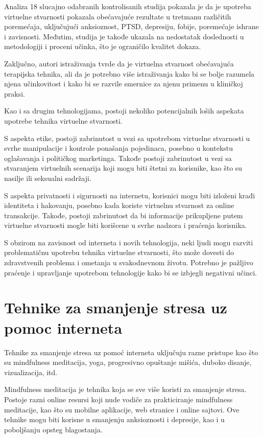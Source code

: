 \documentclass[a4paper]{article}
\begin{document}
Analiza 18 slucajno odabranih kontrolisanih studija pokazala je da je upotreba virtuelne stvarnosti pokazala obećavajuće rezultate u tretmanu različitih poremećaja, uključujući anksioznost, PTSD, depresiju, fobije, poremećaje ishrane i zavisnosti. Međutim, studija je takođe ukazala na nedostatak doslednosti u metodologiji i proceni učinka, što je ograničilo kvalitet dokaza.

Zaključno, autori istraživanja tvrde da je virtuelna stvarnost obećavajuća terapijska tehnika, ali da je potrebno više istraživanja kako bi se bolje razumela njena učinkovitost i kako bi se razvile smernice za njenu primenu u kliničkoj praksi.

Kao i sa drugim tehnologijama, postoji nekoliko potencijalnih loših aspekata upotrebe tehnika virtuelne stvarnosti.

S aspekta etike, postoji zabrinutost u vezi sa upotrebom virtuelne stvarnosti u svrhe manipulacije i kontrole ponašanja pojedinaca, posebno u kontekstu oglašavanja i političkog marketinga. Takođe postoji zabrinutost u vezi sa stvaranjem virtuelnih scenarija koji mogu biti štetni za korisnike, kao što su nasilje ili seksualni sadržaji.

S aspekta privatnosti i sigurnosti na internetu, korisnici mogu biti izloženi krađi identiteta i hakovanju, posebno kada koriste virtuelnu stvarnost za online transakcije. Takođe, postoji zabrinutost da bi informacije prikupljene putem virtuelne stvarnosti mogle biti korišcene u svrhe nadzora i praćenja korisnika.

S obzirom na zavisnost od interneta i novih tehnologija, neki ljudi mogu razviti problematičnu upotrebu tehnika virtuelne stvarnosti, što može dovesti do zdravstvenih problema i ometanja u svakodnevnom životu. Potrebno je pažljivo praćenje i upravljanje upotrebom tehnologije kako bi se izbjegli negativni učinci.

\section{Tehnike za smanjenje stresa uz pomoc interneta}
\label{sec:tehnikeStresa}
Tehnike za smanjenje stresa uz pomoć interneta uključuju razne pristupe kao što su mindfulness meditacija, yoga, progresivno opuštanje mišića, duboko disanje, vizualizacija, itd.

Mindfulness meditacija je tehnika koja se sve više koristi za smanjenje stresa. Postoje razni online resursi koji nude vodiče za prakticiranje mindfulness meditacije, kao što su mobilne aplikacije, web stranice i online sajtovi. Ove tehnike mogu biti korisne u smanjenju anksioznosti i depresije, kao i u poboljšanju opsteg blagostanja.
\end{document}
